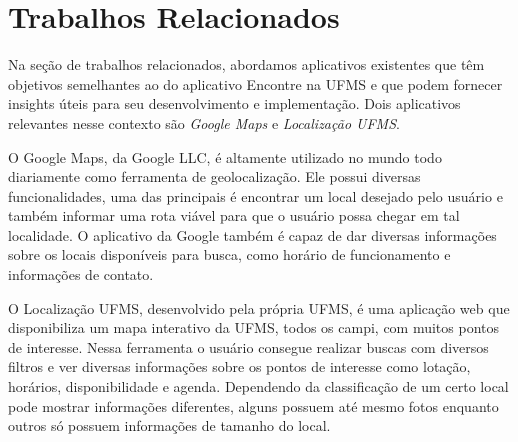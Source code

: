 \section{Trabalhos Relacionados}

Na seção de trabalhos relacionados, abordamos aplicativos existentes que têm objetivos semelhantes ao do aplicativo Encontre na UFMS e que podem fornecer insights úteis para seu desenvolvimento e implementação. Dois aplicativos relevantes nesse contexto são \textit{Google Maps}\cite{maps2005} e \textit{Localização UFMS}\cite{localizacaoufms}.

O Google Maps, da Google LLC, é altamente utilizado no mundo todo diariamente como ferramenta de geolocalização. Ele possui diversas funcionalidades, uma das principais é encontrar um local desejado pelo usuário e também informar uma rota viável para que o usuário possa chegar em tal localidade. O aplicativo da Google também é capaz de dar diversas informações sobre os locais disponíveis para busca, como horário de funcionamento e informações de contato.

O Localização UFMS, desenvolvido pela própria UFMS, é uma aplicação web que disponibiliza um mapa interativo da UFMS, todos os campi, com muitos pontos de interesse. Nessa ferramenta o usuário consegue realizar buscas com diversos filtros e ver diversas informações sobre os pontos de interesse como lotação, horários, disponibilidade e agenda. Dependendo da classificação de um certo local pode mostrar informações diferentes, alguns possuem até mesmo fotos enquanto outros só possuem informações de tamanho do local. 